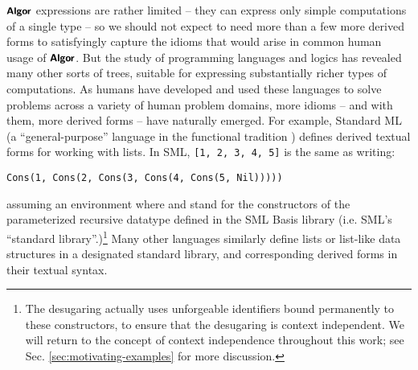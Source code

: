 $\textsf{\textbf{\small Algor}}$ expressions are rather limited -- they can express only simple computations of a single type -- so we should not expect to need more than a few more derived forms  to satisfyingly capture the  idioms that would arise in common human usage of $\textsf{\textbf{\small Algor}}$. %
But the study of programming languages and logics has revealed many other sorts of trees, suitable for expressing substantially richer types of computations.  As humans have developed and used these languages to solve problems across a variety of human problem domains, more idioms -- and with them, more derived forms -- have naturally emerged.  For example, Standard ML (a ``general-purpose''  language in the functional tradition \cite{mthm97-for-dart,harper1997programming}) defines derived textual forms for working with lists. In SML, \lstinline{[1, 2, 3, 4, 5]} is the same as writing: 
\begin{lstlisting}[numbers=none]
Cons(1, Cons(2, Cons(3, Cons(4, Cons(5, Nil)))))
\end{lstlisting}
assuming an environment where  and  stand for the constructors of the parameterized recursive datatype  defined in the SML Basis library (i.e. SML's ``standard library''.)\footnote{The desugaring actually uses unforgeable identifiers bound permanently to these constructors, to ensure that the desugaring is context independent. We will return to the concept of context independence throughout this work; see Sec. \ref{sec:motivating-examples} for more discussion.} Many other languages similarly define lists or list-like data structures in a designated standard library, and corresponding derived forms in their textual syntax. 


